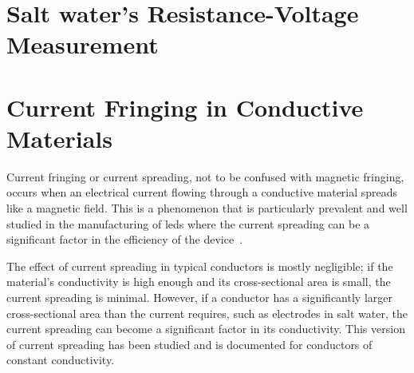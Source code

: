 
\section{Salt water's Resistance-Voltage Measurement}

\section{Current Fringing in Conductive Materials}

Current fringing or current spreading, not to be confused with magnetic fringing, occurs when an electrical current flowing through a conductive material spreads like a magnetic field.
This is a phenomenon that is particularly prevalent and well studied in the manufacturing of \glspl{led} where the current spreading can be a significant factor in the efficiency of the device~\cite{solomentsev_LED_current_spreading_2022, hwang_LED_current_spreading_2008, jeon_LED_current_spreading_2001}.

The effect of current spreading in typical conductors is mostly negligible; if the material's conductivity is high enough and its cross-sectional area is small, the current spreading is minimal.
However, if a conductor has a significantly larger cross-sectional area than the current requires, such as electrodes in salt water, the current spreading can become a significant factor in its conductivity.
This version of current spreading has been studied and is documented for conductors of constant conductivity.~\cite{jason_current_spreading_long_objects_2008}

